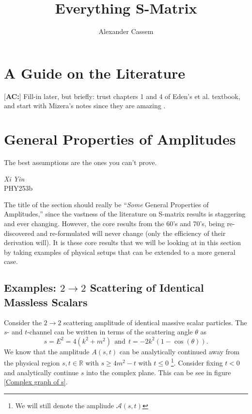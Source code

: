 \documentclass[a4paper,11pt]{article}
\title{Everything S-Matrix}
\author[a]{Alexander Cassem}
\affiliation[a]{Institute of Cosmology, Tufts University, Medford, MA 02155, USA}
\newcommand{\ac}[1]{\textcolor{green3}{[\textbf{AC:}] #1}}
\begin{document}
\maketitle
\flushbottom

\section{A Guide on the Literature}

\ac{Fill-in later, but briefly: trust chapters 1 and 4 of Eden's et al. textbook, and start with Mizera's notes since they are amazing} \cite{Eden:1966dnq,Mizera:2023tfe}.

\section{General Properties of Amplitudes}

\epigraph{The best assumptions are the ones you can't prove.}{\textit{Xi Yin}\\PHY253b}

The title of the section should really be ``\textit{Some} General Properties of Amplitudes,'' since the vastness of the literature on S-matrix results is staggering and ever changing. However, the core results from the 60's and 70's, being re-discovered and re-formulated will never change (only the efficiency of their derivation will). It is these core results that we will be looking at in this section by taking examples of physical setups that can be extended to a more general case. 

\subsection{Examples: $2\rightarrow 2$ Scattering of Identical Massless Scalars}

Consider the $2\rightarrow 2$ scattering amplitude of identical massive scalar particles. The $s$- and $t$-channel can be written in terms of the scattering angle $\theta$ as
\begin{equation}
    s = E^2 = 4(k^2+m^2)\:\:\text{and}\:\: t = -2k^2(1-\cos(\theta))\label{parameterization of s and t channels}.
\end{equation}
We know that the amplitude $A(s,t)$ can be analytically continued away from the physical region $s,t\in\mathbb{R}$ with $s\geq 4m^2-t$ with $t\leq 0$ \footnote{We will still denote the ampliude $\mathcal{A}(s,t)$}. Consider fixing $t<0$ and analytically continue $s$ into the complex plane. This can be see in figure \ref{Complex graph of s}.
\end{document}
